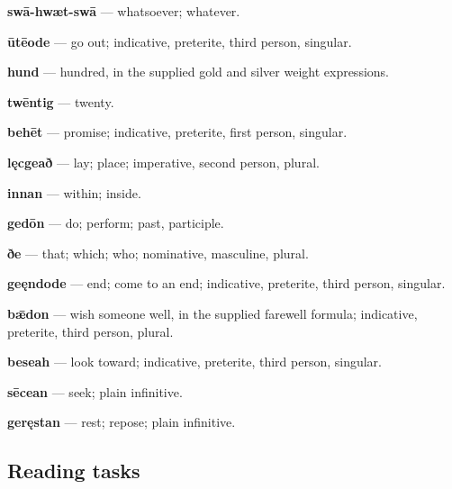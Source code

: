 \textbf{swā-hwæt-swā} — whatsoever; whatever.

\textbf{ūtēode} — go out; indicative, preterite, third person, singular.

\textbf{hund} — hundred, in the supplied gold and silver weight expressions.

\textbf{twēntig} — twenty.

\textbf{behēt} — promise; indicative, preterite, first person, singular.

\textbf{lęcgeað} — lay; place; imperative, second person, plural.

\textbf{innan} — within; inside.

\textbf{gedōn} — do; perform; past, participle.

\textbf{ðe} — that; which; who; nominative, masculine, plural.

\textbf{geęndode} — end; come to an end; indicative, preterite, third person, singular.

\textbf{bǣdon} — wish someone well, in the supplied farewell formula; indicative, preterite, third person, plural.

\textbf{beseah} — look toward; indicative, preterite, third person, singular.

\textbf{sēcean} — seek; plain infinitive.

\textbf{geręstan} — rest; repose; plain infinitive.

\subsection*{Reading tasks}


